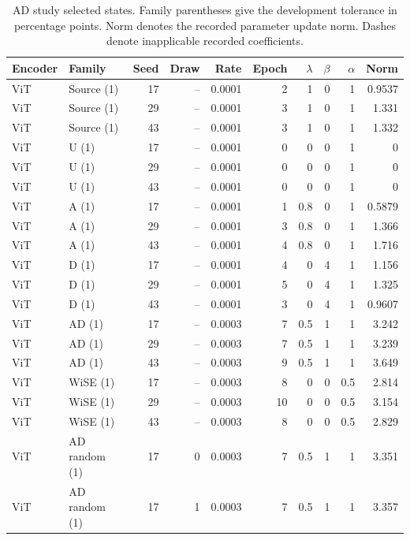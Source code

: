 \begin{table}[t]
\centering
\scriptsize
\setlength{\tabcolsep}{3pt}
\begin{tabular}{llrrrrrrrr}
\toprule
Encoder & Family & Seed & Draw & Rate & Epoch & $\lambda$ & $\beta$ & $\alpha$ & Norm\\
\midrule
ViT & Source (1) & 17 & -- & 0.0001 & 2 & 1 & 0 & 1 & 0.9537\\
ViT & Source (1) & 29 & -- & 0.0001 & 3 & 1 & 0 & 1 & 1.331\\
ViT & Source (1) & 43 & -- & 0.0001 & 3 & 1 & 0 & 1 & 1.332\\
ViT & U (1) & 17 & -- & 0.0001 & 0 & 0 & 0 & 1 & 0\\
ViT & U (1) & 29 & -- & 0.0001 & 0 & 0 & 0 & 1 & 0\\
ViT & U (1) & 43 & -- & 0.0001 & 0 & 0 & 0 & 1 & 0\\
ViT & A (1) & 17 & -- & 0.0001 & 1 & 0.8 & 0 & 1 & 0.5879\\
ViT & A (1) & 29 & -- & 0.0001 & 3 & 0.8 & 0 & 1 & 1.366\\
ViT & A (1) & 43 & -- & 0.0001 & 4 & 0.8 & 0 & 1 & 1.716\\
ViT & D (1) & 17 & -- & 0.0001 & 4 & 0 & 4 & 1 & 1.156\\
ViT & D (1) & 29 & -- & 0.0001 & 5 & 0 & 4 & 1 & 1.325\\
ViT & D (1) & 43 & -- & 0.0001 & 3 & 0 & 4 & 1 & 0.9607\\
ViT & AD (1) & 17 & -- & 0.0003 & 7 & 0.5 & 1 & 1 & 3.242\\
ViT & AD (1) & 29 & -- & 0.0003 & 7 & 0.5 & 1 & 1 & 3.239\\
ViT & AD (1) & 43 & -- & 0.0003 & 9 & 0.5 & 1 & 1 & 3.649\\
ViT & WiSE (1) & 17 & -- & 0.0003 & 8 & 0 & 0 & 0.5 & 2.814\\
ViT & WiSE (1) & 29 & -- & 0.0003 & 10 & 0 & 0 & 0.5 & 3.154\\
ViT & WiSE (1) & 43 & -- & 0.0003 & 8 & 0 & 0 & 0.5 & 2.829\\
ViT & AD random (1) & 17 & 0 & 0.0003 & 7 & 0.5 & 1 & 1 & 3.351\\
ViT & AD random (1) & 17 & 1 & 0.0003 & 7 & 0.5 & 1 & 1 & 3.357\\
\bottomrule
\end{tabular}
\caption{AD study selected states. Family parentheses give the development tolerance in percentage points. Norm denotes the recorded parameter update norm. Dashes denote inapplicable recorded coefficients.}\label{tab:adselected0}
\end{table}


